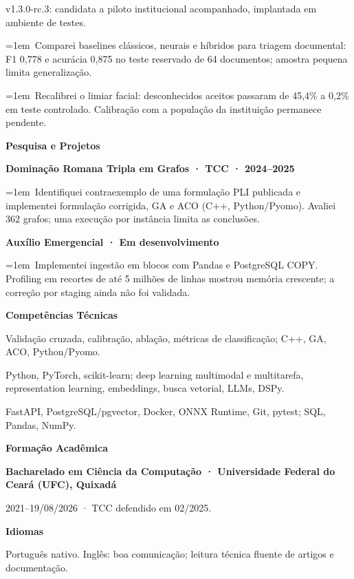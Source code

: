 \documentclass[a4paper,10pt]{article}
\begin{document}
v1.3.0-rc.3: candidata a piloto institucional acompanhado, implantada em ambiente de testes.\par
\hangindent=1em\textbullet\ Comparei baselines clássicos, neurais e híbridos para triagem documental: F1 0,778 e acurácia 0,875 no teste reservado de 64 documentos; amostra pequena limita generalização.\par
\hangindent=1em\textbullet\ Recalibrei o limiar facial: desconhecidos aceitos passaram de 45,4\% a 0,2\% em teste controlado. Calibração com a população da instituição permanece pendente.\par
\vspace{5pt}\textbf{Pesquisa e Projetos}\par
\textbf{Dominação Romana Tripla em Grafos · TCC · 2024–2025}\par
\hangindent=1em\textbullet\ Identifiquei contraexemplo de uma formulação PLI publicada e implementei formulação corrigida, GA e ACO (C++, Python/Pyomo). Avaliei 362 grafos; uma execução por instância limita as conclusões.\par
\textbf{Auxílio Emergencial · Em desenvolvimento}\par
\hangindent=1em\textbullet\ Implementei ingestão em blocos com Pandas e PostgreSQL COPY. Profiling em recortes de até 5 milhões de linhas mostrou memória crescente; a correção por staging ainda não foi validada.\par
\vspace{5pt}\textbf{Competências Técnicas}\par
Validação cruzada, calibração, ablação, métricas de classificação; C++, GA, ACO, Python/Pyomo.\par
Python, PyTorch, scikit-learn; deep learning multimodal e multitarefa, representation learning, embeddings, busca vetorial, LLMs, DSPy.\par
FastAPI, PostgreSQL/pgvector, Docker, ONNX Runtime, Git, pytest; SQL, Pandas, NumPy.\par
\vspace{5pt}\textbf{Formação Acadêmica}\par
\textbf{Bacharelado em Ciência da Computação · Universidade Federal do Ceará (UFC), Quixadá}\par
2021–19/08/2026 · TCC defendido em 02/2025.\par
\vspace{5pt}\textbf{Idiomas}\par
Português nativo. Inglês: boa comunicação; leitura técnica fluente de artigos e documentação.\par
\end{document}
